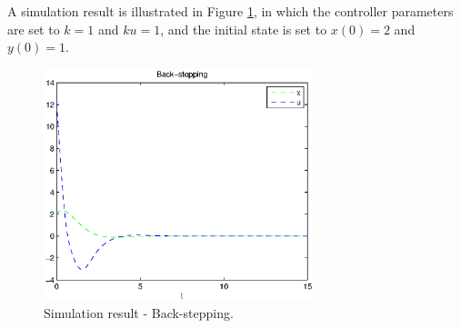 \documentclass[12pt,a4paper]{article}
\begin{document}
\indent A simulation result is illustrated in Figure \ref{assign4_3}, in which the controller parameters are set to $k=1$ and $ku=1$, and the initial state is set to $x(0)=2$ and $y(0)=1$.
\begin{figure}
  \centering
  \includegraphics[width=0.7\textwidth]{figs/assign4_3.eps}%
  \caption{Simulation result - Back-stepping.}
  \label{assign4_3}
\end{figure}
\end{document}
